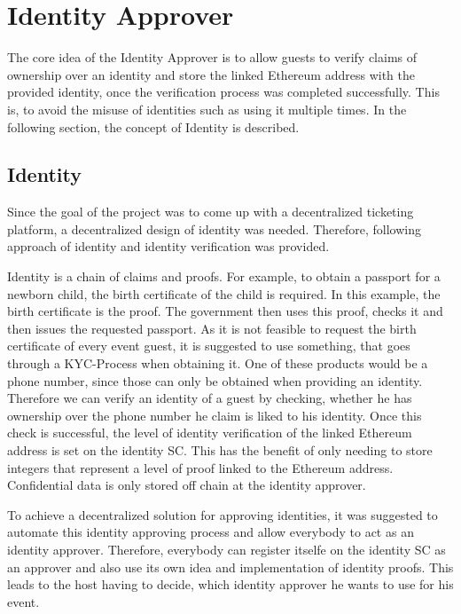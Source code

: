 \section{Identity Approver}

The core idea of the Identity Approver is to allow guests to verify claims of ownership over an identity and store the linked Ethereum address with the provided identity, once the verification process was completed successfully. This is, to avoid the misuse of identities such as using it multiple times. In the following section, the concept of Identity is described.

\subsection{Identity}\label{design:identity}
Since the goal of the project was to come up with a decentralized ticketing platform, a decentralized design of identity was needed. Therefore, following approach of identity and identity verification was provided.

Identity is a chain of claims and proofs. For example, to obtain a passport for a newborn child, the birth certificate of the child is required. In this example, the birth certificate is the proof. The government then uses this proof, checks it and then issues the requested passport. As it is not feasible to request the birth certificate of every event guest, it is suggested to use something, that goes through a KYC-Process when obtaining it. One of these products would be a phone number, since those can only be obtained when providing an identity. Therefore we can verify an identity of a guest by checking, whether he has ownership over the phone number he claim is liked to his identity. Once this check is successful, the level of identity verification of the linked Ethereum address is set on the identity SC. This has the benefit of only needing to store integers that represent a level of proof linked to the Ethereum address. Confidential data is only stored off chain at the identity approver.

To achieve a decentralized solution for approving identities, it was suggested to automate this identity approving process and allow everybody to act as an identity approver. Therefore, everybody can register itselfe on the identity SC as an approver and also use its own idea and implementation of identity proofs.
This leads to the host having to decide, which identity approver he wants to use for his event. 

